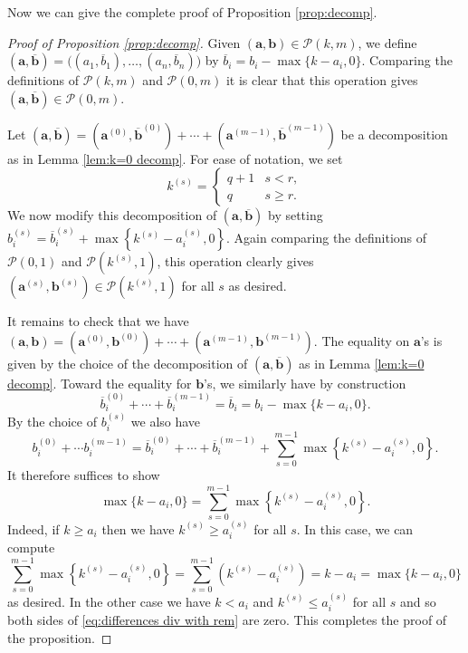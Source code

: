 \documentclass[12pt]{amsart}
\newcommand{\aaa}{\mathbf{a}}
\newcommand{\bbb}{\mathbf{b}}
\numberwithin{equation}{section}
\theoremstyle{definition}
\begin{document}
Now we can give the complete proof of Proposition \ref{prop:decomp}.

\begin{proof}[Proof of Proposition \ref{prop:decomp}]
    Given $(\aaa,\bbb)\in \mathcal{P}(k,m)$, we define $(\aaa,\overline{\bbb})= \big( (a_1,\overline{b}_1),\dots,(a_n,\overline{b}_n) \big)$ by $\overline{b}_i = b_i - \max\{ k-a_i,0 \}$. Comparing the definitions of $\mathcal{P}(k,m)$ and $\mathcal{P}(0,m)$ it is clear that this operation gives $(\aaa,\overline{\bbb})\in \mathcal{P}(0,m)$.

    Let $(\aaa,\overline{\bbb}) = \left(\aaa^{(0)},\overline{\bbb}^{(0)}\right)+\cdots+\left(\aaa^{(m-1)},\overline{\bbb}^{(m-1)}\right)$ be a decomposition as in Lemma \ref{lem:k=0 decomp}. For ease of notation, we set 
    \[ k^{(s)} = \begin{cases}
        q+1 & s< r,\\
        q & s\geq r.
    \end{cases} \]
    We now modify this decomposition of $(\aaa,\overline{\bbb})$ by setting $b^{(s)}_i = \overline{b}^{(s)}_i +\max\left\{k^{(s)} - a^{(s)}_i,0\right\}.$
    Again comparing the definitions of $\mathcal{P}(0,1)$ and $\mathcal{P}(k^{(s)},1)$, this operation clearly gives $\left(\aaa^{(s)},\bbb^{(s)}\right)\in \mathcal{P}\left(k^{(s)},1\right)$ for all $s$ as desired.
    
    It remains to check that we have $\left(\aaa,\bbb\right) = \left(\aaa^{(0)},\bbb^{(0)}\right)+\cdots+\left(\aaa^{(m-1)},\bbb^{(m-1)}\right)$. The equality on $\aaa$'s is given by the choice of the decomposition of $\left(\aaa,\overline{\bbb}\right)$ as in Lemma \ref{lem:k=0 decomp}. Toward the equality for $\bbb$'s, we similarly have by construction 
    \[ \overline{b}^{(0)}_i+\cdots+\overline{b}^{(m-1)}_i = \overline{b}_i = b_i - \max\{ k-a_i,0 \}. \]
    By the choice of $b_i^{(s)}$ we also have 
    \[ b_i^{(0)} + \cdots b_i^{(m-1)} = \overline{b}^{(0)}_i+\cdots+\overline{b}^{(m-1)}_i + \sum_{s=0}^{m-1} \max\left\{k^{(s)} - a^{(s)}_i,0\right\}. \]
    It therefore suffices to show 
    \begin{equation}\label{eq:differences div with rem}
        \max\{ k-a_i,0 \} = \sum_{s=0}^{m-1} \max\left\{k^{(s)} - a^{(s)}_i,0\right\}. 
    \end{equation} 
    Indeed, if $k\geq a_i$ then we have $k^{(s)}\geq a^{(s)}_i$ for all $s$. In this case, we can compute
    \[ \sum_{s=0}^{m-1} \max\left\{k^{(s)} - a^{(s)}_i,0\right\} = \sum_{s=0}^{m-1}\left(k^{(s)}-a_i^{(s)}\right) = k-a_i = \max\{ k-a_i,0 \} \]
    as desired. In the other case we have $k<a_i$ and $k^{(s)}\leq a^{(s)}_i$ for all $s$ and so both sides of \eqref{eq:differences div with rem} are zero. This completes the proof of the proposition.
\end{proof}
\end{document}
